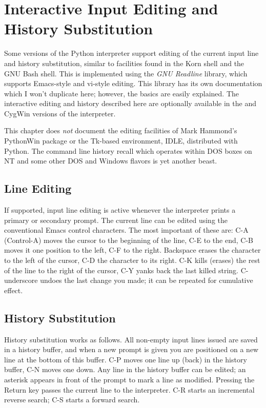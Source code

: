 \documentclass{manual}
\begin{document}
\appendix

\chapter{Interactive Input Editing and History Substitution
         \label{interacting}}

Some versions of the Python interpreter support editing of the current
input line and history substitution, similar to facilities found in
the Korn shell and the GNU Bash shell.  This is implemented using the
\emph{GNU Readline} library, which supports Emacs-style and vi-style
editing.  This library has its own documentation which I won't
duplicate here; however, the basics are easily explained.  The
interactive editing and history described here are optionally
available in the \UNIX{} and CygWin versions of the interpreter.

This chapter does \emph{not} document the editing facilities of Mark
Hammond's PythonWin package or the Tk-based environment, IDLE,
distributed with Python.  The command line history recall which
operates within DOS boxes on NT and some other DOS and Windows flavors 
is yet another beast.

\section{Line Editing \label{lineEditing}}

If supported, input line editing is active whenever the interpreter
prints a primary or secondary prompt.  The current line can be edited
using the conventional Emacs control characters.  The most important
of these are: C-A (Control-A) moves the cursor to the beginning of the
line, C-E to the end, C-B moves it one position to the left, C-F to
the right.  Backspace erases the character to the left of the cursor,
C-D the character to its right.  C-K kills (erases) the rest of the
line to the right of the cursor, C-Y yanks back the last killed
string.  C-underscore undoes the last change you made; it can be
repeated for cumulative effect.

\section{History Substitution \label{history}}

History substitution works as follows.  All non-empty input lines
issued are saved in a history buffer, and when a new prompt is given
you are positioned on a new line at the bottom of this buffer.  C-P
moves one line up (back) in the history buffer, C-N moves one down.
Any line in the history buffer can be edited; an asterisk appears in
front of the prompt to mark a line as modified.  Pressing the Return
key passes the current line to the interpreter.  C-R starts an
incremental reverse search; C-S starts a forward search.
\end{document}
